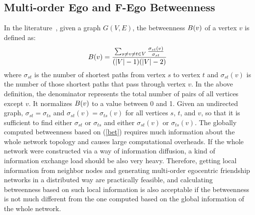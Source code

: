 \subsection{Multi-order Ego and F-Ego Betweenness}\label{betweenness-sub}
In the literature~\cite{centrality, everett, Brandes01afaster}, given a graph $G(V, E)$, the betweenness $B({v})$ of a vertex $v$ is defined as:
\begin{equation}\label{bet}
B({v}) = \frac{\sum_{s \neq v \neq t \in V}\frac{\sigma_{st}(v)}{\sigma_{st}}}{(|V|-1)(|V|-2)}
\end{equation} where $\sigma_{st}$ is the number of shortest paths from vertex $s$ to vertex $t$ and $\sigma_{st}(v)$ is the number of those shortest paths that pass through vertex $v$. 
In the above definition, the denominator represents the total number of pairs of all vertices except $v$.
It normalizes $B({v})$ to a value between 0 and 1.
Given an undirected graph, $\sigma_{st}=\sigma_{ts}$ and $\sigma_{st}(v)=\sigma_{ts}(v)$ for all vertices $s$, $t$, and $v$, so that it is sufficient to find either $\sigma_{st}$ or $\sigma_{ts}$ and either $\sigma_{st}(v)$ or $\sigma_{ts}(v)$.
The globally computed betweenness based on (\ref{bet}) requires much information about the whole network topology and causes large computational overheads. If the whole network were constructed via a way of information diffusion, a kind of information exchange load should be also very heavy. 
Therefore, getting local information from neighbor nodes and generating multi-order egocentric friendship networks in a distributed way are practically feasible, and calculating betweenness based on such local information is also acceptable if the betweenness is not much different from the one computed based on the global information of the whole network.
 
